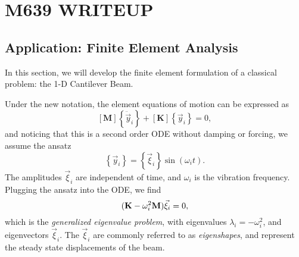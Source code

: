 \chapter{M639 WRITEUP}
\label{M639}

\section{Application: Finite Element Analysis}
In this section, we will develop the finite element formulation of a classical problem: the 1-D Cantilever Beam.

Under the new notation, the element equations of motion can be expressed as
\[
[\textbf{M}]\left\{\ddot{\vec y}_i\right\}+[\textbf{K}]\left\{\vec y_i\right\} = 0,
\]
and noticing that this is a second order ODE without damping or forcing, we assume the ansatz
\[
\left\{\vec y_i\right\} = \left\{\vec \xi_i\right\}\sin(\omega_i t).
\]
The amplitudes $\vec \xi_i$ are independent of time, and $\omega_i$ is the vibration frequency.
Plugging the ansatz into the ODE, we find
\[
(\textbf K-\omega_i^2\textbf M)\vec \xi_i = 0,
\]
which is the \emph{generalized eigenvalue problem}, with eigenvalues $\lambda_i = -\omega_i^2$, and eigenvectors $\vec \xi_i$. The $\vec\xi_i$ are commonly referred to as \emph{eigenshapes}, and represent the steady state displacements of the beam.\newline
